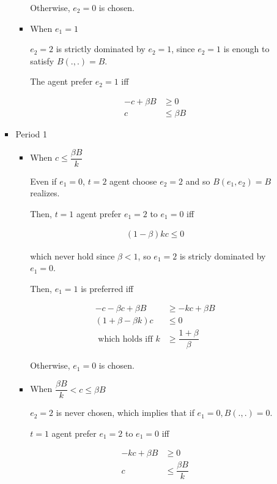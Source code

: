 \documentclass{jsarticle}
\begin{document}
\begin{enumerate}
\begin{enumerate}
\begin{itemize}
\begin{itemize}
Otherwise, $e_2=0$ is chosen.

\item When $e_1=1$

$e_2=2$ is strictly dominated by $e_2=1$, since $e_2=1$ is enough to satisfy $B(.,.)=B$.

The agent prefer $e_2=1$ iff

\begin{align*}
-c + \beta B & \geq 0 \\
c & \leq \beta B
\end{align*}

\end{itemize}

\newpage

\item Period 1

\begin{itemize}

\item When $c \leq \dfrac{\beta B}{k}$

Even if $e_1=0$, $t=2$ agent choose $e_2=2$ and so $B(e_1, e_2)=B$ realizes.

Then, $t=1$ agent prefer $e_1=2$ to $e_1=0$ iff

\begin{align*}
(1-\beta)kc \leq 0
\end{align*}

which never hold since $\beta<1$, so $e_1=2$ is stricly dominated by $e_1=0$.

Then, $e_1=1$ is preferred iff

\begin{align*}
-c - \beta c + \beta B &\geq - kc + \beta B \\
(1+\beta - \beta k)c &\leq 0 \\
\text{ which holds iff }
k &\geq \dfrac{1+\beta}{\beta}
\end{align*}

Otherwise, $e_1=0$ is chosen.

\item When $\dfrac{\beta B}{k} < c \leq \beta B $

$e_2=2$ is never chosen, which implies that if $e_1=0,B(.,.)=0$.

$t=1$ agent prefer $e_1=2$ to $e_1=0$ iff

\begin{align*}
- kc + \beta B &\geq 0 \\
c &\leq \dfrac{\beta B}{k}
\end{align*}


\end{itemize}
\end{itemize}
\end{enumerate}
\end{enumerate}
\end{document}
